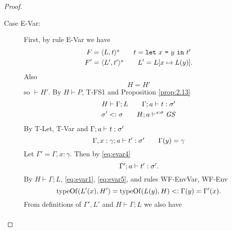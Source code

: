 \begin{proof}
\begin{description}
\begin{description}
\begin{description}
            \item[Case {\sc E-Var}:] First, by rule {\sc E-Var} we have
              \begin{equation} 
                \begin{gathered}
                  F = \mbox{$\langle L, t \rangle^s$} \quad\quad t = \mbox{\mdseries\texttt{let}~$x$~\texttt{=}~$y$~\texttt{in}~$t'$} \\ 
                  F' = \mbox{$\langle L', t' \rangle^s$} \quad\quad L' = L[x \mapsto L(y)].
                \end{gathered}
              \end{equation}
              Also
              \begin{equation} \label{eq:evar1}
                H = H'
              \end{equation}
              so $\vdash H'$.
              By $H \vdash P$, {\sc T-FS1} and Proposition \ref{prop:2.13}
              \begin{equation} \label{eq:evar3}
                \begin{gathered}
                  H \vdash \Gamma; L \quad\quad \mbox{$\Gamma;a\vdash t:\sigma'$} \\
                  \sigma' <: \sigma \quad\quad H; a \vdash^{s: \sigma} \mathit{GS}
                \end{gathered}
              \end{equation}
              By {\sc T-Let, T-Var} and $\mbox{$\Gamma;a\vdash t:\sigma'$}$
              \begin{equation} \label{eq:evar4}
                \mbox{$\Gamma, x: \gamma;a\vdash t':\sigma'$} \quad\quad \Gamma(y) =
                \gamma
              \end{equation}
              Let $\Gamma' = \Gamma, x: \gamma$.
              Then by \eqref{eq:evar4}
              \begin{equation} \label{eq:evar5}
                \mbox{$\Gamma';a\vdash t':\sigma'$}.
              \end{equation}
              By $H \vdash \Gamma; L$, \eqref{eq:evar1}, \eqref{eq:evar5}, and
              rules {\sc WF-EnvVar}, {\sc WF-Env}
              \begin{equation} \label{eq:evar8}
                \mbox{$\mathrm{typeOf}$}(L'(x), H') = \mbox{$\mathrm{typeOf}$}(L(y), H) <: \Gamma(y) =
                \Gamma'(x).
              \end{equation}
              From definitions of $\Gamma', L'$ and $H \vdash \Gamma;L$ we also have 
              \begin{equation} \label{eq:evar9}
                \begin{aligned}

\end{aligned}
\end{equation}
\end{description}
\end{description}
\end{description}
\end{proof}
